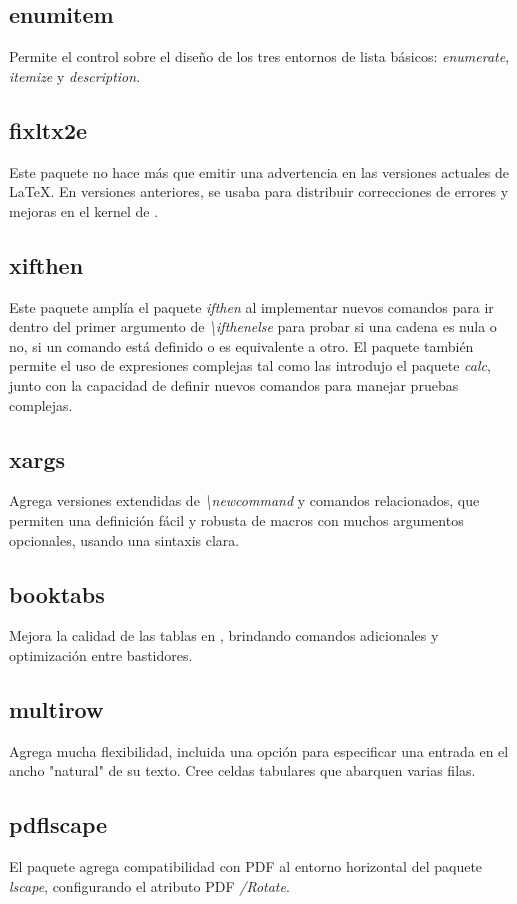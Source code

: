 \documentclass[12pt]{article}
\begin{document}
\subsection{enumitem}
Permite el control sobre el diseño de los tres entornos de lista básicos: \textit{enumerate}, \textit{itemize} y \textit{description}.\cite{enumitem}
\subsection{fixltx2e}
Este paquete no hace más que emitir una advertencia en las versiones actuales de \LaTeX. En versiones anteriores, se usaba para distribuir correcciones de errores y mejoras en el kernel de . \cite{fixltx2e}
\subsection{xifthen}
Este paquete amplía el paquete \textit{ifthen} al implementar nuevos comandos para ir dentro del primer argumento de \textit{\textbackslash ifthenelse} para probar si una cadena es nula o no, si un comando está definido o es equivalente a otro. El paquete también permite el uso de expresiones complejas tal como las introdujo el paquete \textit{calc}, junto con la capacidad de definir nuevos comandos para manejar pruebas complejas.\cite{xifthen}
\subsection{xargs}
Agrega versiones extendidas de \textit{\textbackslash newcommand} y comandos  relacionados, que permiten una definición fácil y robusta de macros con muchos argumentos opcionales, usando una sintaxis clara.\cite{xargs}
\subsection{booktabs}
Mejora la calidad de las tablas en , brindando comandos adicionales y optimización entre bastidores.\cite{booktabs}
\subsection{multirow}
Agrega mucha flexibilidad, incluida una opción para especificar una entrada en el ancho "natural" de su texto. Cree celdas tabulares que abarquen varias filas.\cite{multirow}
\subsection{pdflscape}
El paquete agrega compatibilidad con PDF al entorno horizontal del paquete \textit{lscape}, configurando el atributo PDF \textit{/Rotate}.\cite{pdflscape}
\end{document}
